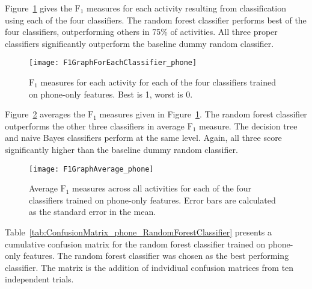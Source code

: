     Figure~\ref{fig:F1GraphForEachClassifier_phone} gives the $\mathrm{F}_1$ measures for each activity resulting from classification using each of the four classifiers. The random forest classifier performs best of the four classifiers, outperforming others in 75\% of activities. All three proper classifiers significantly outperform the baseline dummy random classifier.

    \begin{figure}[htb]
      \centering
      \texttt{[image: F1GraphForEachClassifier\_phone]}
      \caption[$\mathrm{F}_1$ measures for each activity for each of the four classifiers trained on phone-only features.]{$\mathrm{F}_1$ measures for each activity for each of the four classifiers trained on phone-only features. Best is 1, worst is 0.}
      \label{fig:F1GraphForEachClassifier_phone}
    \end{figure}
    
    Figure~\ref{fig:F1GraphAverage_phone} averages the $\mathrm{F}_1$ measures given in Figure~\ref{fig:F1GraphForEachClassifier_phone}. The random forest classifier outperforms the other three classifiers in average $\mathrm{F}_1$ measure. The decision tree and naive Bayes classifiers perform at the same level. Again, all three score significantly higher than the baseline dummy random classifier.
    
    \begin{figure}[htb]
      \centering
      \texttt{[image: F1GraphAverage\_phone]}
      \caption[Average $\mathrm{F}_1$ measures across all activities for each of the four classifiers trained on phone-only features.]{Average $\mathrm{F}_1$ measures across all activities for each of the four classifiers trained on phone-only features. Error bars are calculated as the standard error in the mean.}
      \label{fig:F1GraphAverage_phone} 
    \end{figure}
    
    Table~\ref{tab:ConfusionMatrix_phone_RandomForestClassifier} presents a cumulative confusion matrix for the random forest classifier trained on phone-only features. The random forest classifier was chosen as the best performing classifier. The matrix is the addition of indvidiual confusion matrices from ten independent trials.
    
